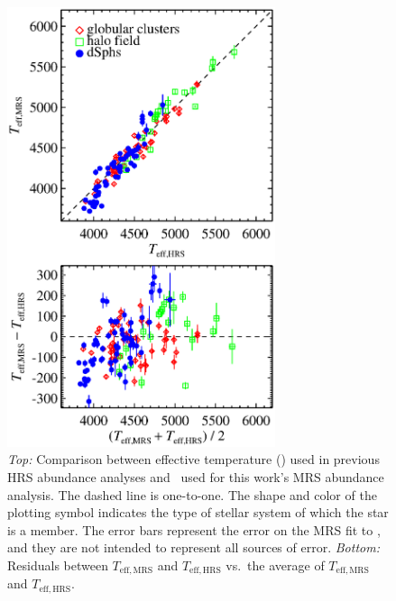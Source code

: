\documentclass{emulateapj}
\begin{document}
\begin{figure}[p]
\centering
\begin{minipage}[t]{0.48\textwidth}
\centering
\includegraphics[width=0.7\textwidth]{teff_compare_orthogonal.eps}
\caption{{\it Top:} Comparison between effective temperature (\teff)
  used in previous HRS abundance analyses and \teff\ used for this
  work's MRS abundance analysis.  The dashed line is one-to-one.  The
  shape and color of the plotting symbol indicates the type of stellar
  system of which the star is a member.  The error bars represent the
  error on the MRS fit to \teff, and they are not intended to
  represent all sources of error.  {\it Bottom:} Residuals between
  $T_{\mathrm{eff,MRS}}$ and $T_{\mathrm{eff,HRS}}$ vs.\ the average
  of $T_{\mathrm{eff,MRS}}$ and
  $T_{\mathrm{eff,HRS}}$.}
\end{minipage}
\end{figure}
\end{document}
